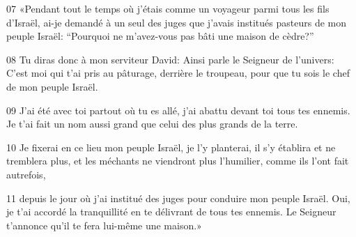
07 «Pendant tout le temps où j’étais comme un voyageur parmi tous les fils d’Israël, ai-je demandé à un seul des juges que j’avais institués pasteurs de mon peuple Israël: “Pourquoi ne m’avez-vous pas bâti une maison de cèdre?”

08 Tu diras donc à mon serviteur David: Ainsi parle le Seigneur de l’univers: C’est moi qui t’ai pris au pâturage, derrière le troupeau, pour que tu sois le chef de mon peuple Israël.

09 J’ai été avec toi partout où tu es allé, j’ai abattu devant toi tous tes ennemis. Je t’ai fait un nom aussi grand que celui des plus grands de la terre.

10 Je fixerai en ce lieu mon peuple Israël, je l’y planterai, il s’y établira et ne tremblera plus, et les méchants ne viendront plus l’humilier, comme ils l’ont fait autrefois,

11 depuis le jour où j’ai institué des juges pour conduire mon peuple Israël. Oui, je t’ai accordé la tranquillité en te délivrant de tous tes ennemis. Le Seigneur t’annonce qu’il te fera lui-même une maison.»
